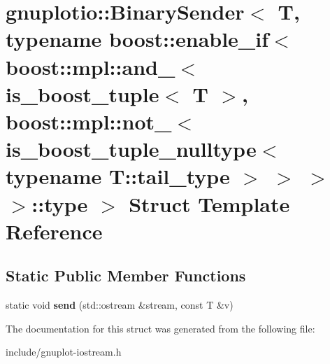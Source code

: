 \hypertarget{structgnuplotio_1_1BinarySender_3_01T_00_01typename_01boost_1_1enable__if_3_01boost_1_1mpl_1_1anab84516ea337555045555dbce2b6c996}{}\section{gnuplotio\+:\+:Binary\+Sender$<$ T, typename boost\+:\+:enable\+\_\+if$<$ boost\+:\+:mpl\+:\+:and\+\_\+$<$ is\+\_\+boost\+\_\+tuple$<$ T $>$, boost\+:\+:mpl\+:\+:not\+\_\+$<$ is\+\_\+boost\+\_\+tuple\+\_\+nulltype$<$ typename T\+:\+:tail\+\_\+type $>$ $>$ $>$ $>$\+:\+:type $>$ Struct Template Reference}
\label{structgnuplotio_1_1BinarySender_3_01T_00_01typename_01boost_1_1enable__if_3_01boost_1_1mpl_1_1anab84516ea337555045555dbce2b6c996}
\subsection*{Static Public Member Functions}
\begin{DoxyCompactItemize}
\item 
\mbox{\label{structgnuplotio_1_1BinarySender_3_01T_00_01typename_01boost_1_1enable__if_3_01boost_1_1mpl_1_1anab84516ea337555045555dbce2b6c996_a90bdbe9d299646a871882da19fdb30a9}} 
static void {\bfseries send} (std\+::ostream \&stream, const T \&v)
\end{DoxyCompactItemize}


The documentation for this struct was generated from the following file\+:\begin{DoxyCompactItemize}
\item 
include/gnuplot-\/iostream.\+h\end{DoxyCompactItemize}
